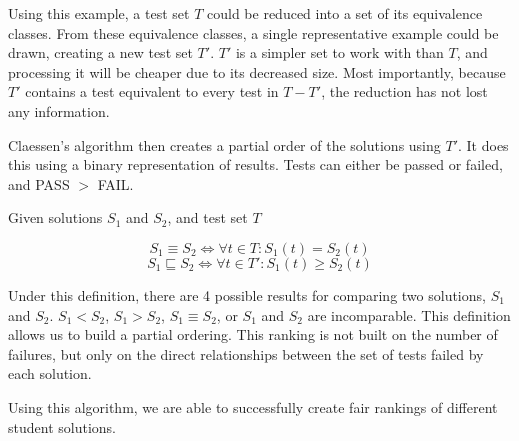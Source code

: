\documentclass[11pt,twoside]{article}
\begin{document}
Using this example, a test set $T$ could be reduced into a set of its equivalence classes. From these equivalence classes, a single representative example could be drawn, creating a new test set $T'$. $T'$ is a simpler set to work with than $T$, and processing it will be cheaper due to its decreased size. Most importantly, because $T'$ contains a test equivalent to every test in $T - T'$, the reduction has not lost any information.


Claessen's algorithm then creates a partial order of the solutions using $T'$. It does this using a binary representation of results. Tests can either be passed or failed, and PASS $>$ FAIL.

\centerline{Given solutions $S_1$ and $S_2$, and test set $T$}
$$S_1 \equiv S_2 \iff \forall t \in T : S_1(t) = S_2(t)$$
$$S_1 \sqsubseteq S_2 \iff \forall t \in T' : S_1(t) \geq S_2(t)$$


Under this definition, there are 4 possible results for comparing two solutions, $S_1$ and $S_2$. $S_1 < S_2$, $S_1 > S_2$, $S_1 \equiv S_2$, or $S_1$ and $S_2$  are incomparable. This definition allows us to build a partial ordering. This ranking is not built on the number of failures, but only on the direct relationships between the set of tests failed by each solution.

Using this algorithm, we are able to successfully create fair rankings of different student solutions.
\end{document}
